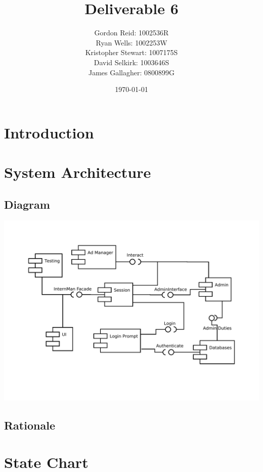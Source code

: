 \documentclass[12pt]{article}
\title{Deliverable 6}
\author{
    Gordon Reid: 1002536R\\
    Ryan Wells: 1002253W\\
    Kristopher Stewart: 1007175S\\
    David Selkirk: 1003646S\\
    James Gallagher: 0800899G\\
}
\date{\today}
\begin{document}
\maketitle

\newpage

\tableofcontents

\newpage

\section{Introduction}

\newpage

\section{System Architecture}

\subsection{Diagram}

\includegraphics[width=\textwidth]{PSDDiagram.pdf}

\subsection{Rationale}

\newpage

\section{State Chart}

\newpage
\end{document}
